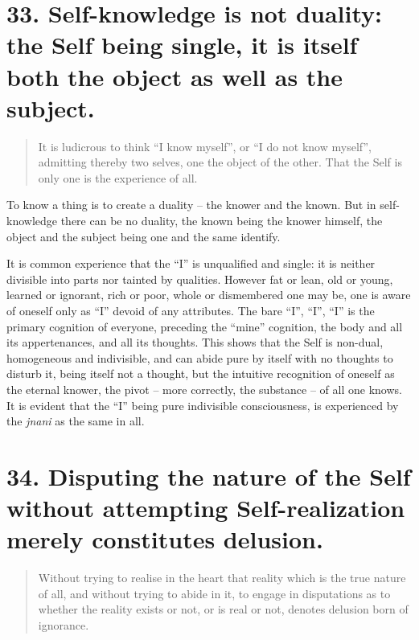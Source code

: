 \documentclass[12pt]{report}
\begin{document}
\section{33. Self-knowledge is not duality: the Self being single, it is itself both the object as well as the subject.}

\begin{quote}
  It is ludicrous to think ``I know myself'', or ``I do not know
  myself'', admitting thereby two selves, one the object of the
  other. That the Self is only one is the experience of all.
\end{quote}


To know a thing is to create a duality -- the knower and the
known. But in self-knowledge there can be no duality, the known being
the knower himself, the object and the subject being one and the same
identify.

It is common experience that the ``I'' is unqualified and single: it
is neither divisible into parts nor tainted by qualities. However fat
or lean, old or young, learned or ignorant, rich or poor, whole or
dismembered one may be, one is aware of oneself only as ``I'' devoid
of any attributes. The bare ``I'', ``I'', ``I'' is the primary
cognition of everyone, preceding the ``mine'' cognition, the body and
all its appertenances, and all its thoughts. This shows that the Self
is non-dual, homogeneous and indivisible, and can abide pure by itself
with no thoughts to disturb it, being itself not a thought, but the
intuitive recognition of oneself as the eternal knower, the pivot --
more correctly, the substance -- of all one knows. It is evident that
the ``I'' being pure indivisible consciousness, is experienced by the
\emph{jnani} as the same in all.

\section{34. Disputing the nature of the Self without attempting
  Self-realization merely constitutes delusion.}

\begin{quote}
  Without trying to realise in the heart that reality which is the
  true nature of all, and without trying to abide in it, to engage in
  disputations as to whether the reality exists or not, or is real or
  not, denotes delusion born of ignorance.
\end{quote}

\end{document}
